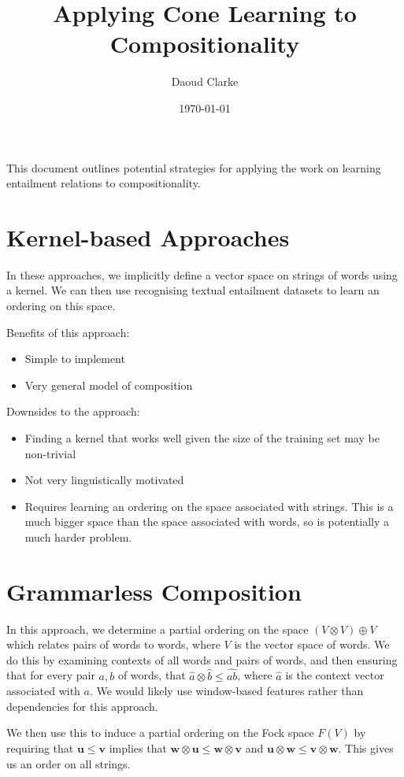\documentclass{article}
\author{Daoud Clarke}
\date{\today}
\title{Applying Cone Learning to Compositionality}
\begin{document}
\maketitle

This document outlines potential strategies for applying the work on
learning entailment relations to compositionality.

\section{Kernel-based Approaches}

In these approaches, we implicitly define a vector space on strings of
words using a kernel. We can then use recognising textual entailment
datasets to learn an ordering on this space.

Benefits of this approach:
\begin{itemize}
\item Simple to implement
\item Very general model of composition
\end{itemize}
Downsides to the approach:
\begin{itemize}
\item Finding a kernel that works well given the size of the training
  set may be non-trivial
\item Not very linguistically motivated
\item Requires learning an ordering on the space associated with
  strings. This is a much bigger space than the space associated with
  words, so is potentially a much harder problem.
\end{itemize}

\section{Grammarless Composition}

In this approach, we determine a partial ordering on the space
$(V\otimes V)\oplus V$ which relates pairs of words to words, where
$V$ is the vector space of words. We do this by examining contexts of
all words and pairs of words, and then ensuring that for every pair
$a,b$ of words, that $\hat{a}\otimes \hat{b} \le \widehat{ab}$, where
$\hat{a}$ is the context vector associated with $a$. We would likely
use window-based features rather than dependencies for this approach.

We then use this to induce a partial ordering on the Fock space $F(V)$
by requiring that $\mathbf{u} \le \mathbf{v}$ implies that
$\mathbf{w}\otimes \mathbf{u} \le \mathbf{w}\otimes\mathbf{v}$ and 
$\mathbf{u}\otimes \mathbf{w} \le \mathbf{v}\otimes\mathbf{w}$. This
gives us an order on all strings.
\end{document}
